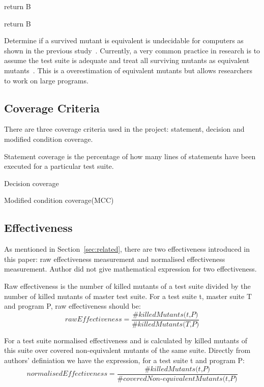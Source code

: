 \begin{algorithm}[H]
	\label{algo:A>B}
	{return B\;
	}
	\caption{Return the number with highest value}
\end{algorithm}

\bigskip

\begin{algorithm}[H]
	\label{algo:A>=B}
	{
		return B\;
	}
	\caption{Return the number with highest value}
\end{algorithm}

Determine if a survived mutant is equivalent is undecidable for computers as shown in the previous study~\cite{budd1982two}. Currently, a very common practice in research is to assume the test suite is adequate and treat all surviving mutants as equivalent mutants~\cite{jia2011analysis}. This is a overestimation of equivalent mutants but allows researchers to work on large programs.

\subsection{Coverage Criteria}
There are three coverage criteria used in the project: statement, decision and modified condition coverage.

Statement coverage is the percentage of how many lines of statements have been executed for a particular test suite. 

Decision coverage

Modified condition coverage(MCC)
\subsection{Effectiveness}
As mentioned in Section~\ref{sec:related}, there are two effectiveness introduced in this paper: raw effectiveness measurement and normalised effectiveness measurement. Author did not give mathematical expression for two effectiveness.

Raw effectiveness is the number of killed mutants of a test suite divided by the number of killed mutants of master test suite. For a test suite t, master suite T and program P, raw effectiveness should be:
\[\textit{rawEffectiveness} = \frac{\#\textit{killedMutants(t,P)}}{\#\textit{killedMutants(T,P)}}\]

For a test suite normalised effectiveness and is calculated by killed mutants of this suite over covered non-equivalent mutants of the same suite. Directly from authors' definiation we have the expression, for a test suite t and program P:
\[\textit{normalisedEffectiveness} = \frac{\#\textit{killedMutants(t,P)}}{\#\textit{coveredNon-equivalentMutants(t,P)}}\]

